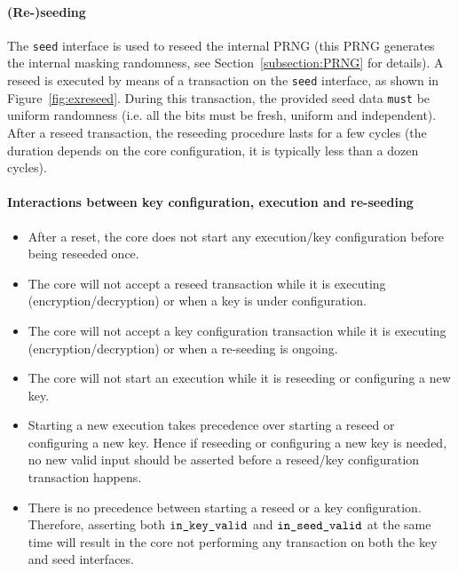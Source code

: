 \documentclass{scrartcl}
\begin{document}
\paragraph{(Re-)seeding}

The \texttt{seed} interface is used to reseed the internal PRNG (this
PRNG generates the internal masking randomness, see
Section~\ref{subsection:PRNG} for details).
A reseed is executed by means of a transaction on the \texttt{seed} interface,
as shown in Figure~\ref{fig:exreseed}.
During this transaction, the provided seed data \texttt{must} be uniform
randomness (i.e. all the bits must be fresh, uniform and independent).
After a reseed transaction, the reseeding procedure lasts for a few cycles (the
duration depends on the core configuration, it is typically less than a dozen
cycles). 

\paragraph{Interactions between key configuration, execution and re-seeding}
\begin{itemize}
    \item After a reset, the core does not start any execution/key configuration before being reseeded once. 
    \item The core will not accept a reseed transaction while it is executing (encryption/decryption) or when a key is under configuration.
    \item The core will not accept a key configuration transaction while it is executing (encryption/decryption) or when a re-seeding is ongoing.
    \item The core will not start an execution while it is reseeding or configuring a new key.
    \item Starting a new execution takes precedence over starting a reseed or configuring a new key.
        Hence if reseeding or configuring a new key is needed, no new valid input should be asserted
        before a reseed/key configuration transaction happens.
    \item There is no precedence between starting a reseed or a key configuration. Therefore, asserting both $\texttt{in\_key\_valid}$ and $\texttt{in\_seed\_valid}$ at the same time 
        will result in the core not performing any transaction on both the key and seed interfaces. 
\end{itemize}
\end{document}
